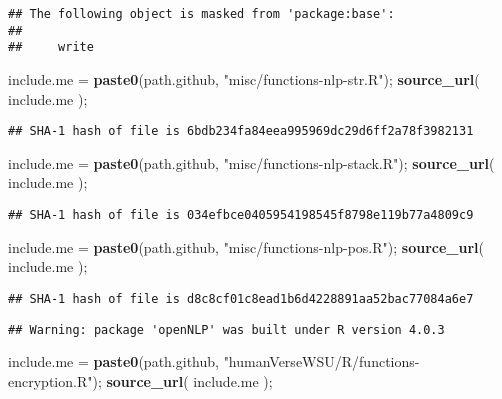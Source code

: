 \documentclass[
]{article}
\newenvironment{Shaded}{\begin{snugshade}}{\end{snugshade}}
\newcommand{\KeywordTok}[1]{\textcolor[rgb]{0.13,0.29,0.53}{\textbf{#1}}}
\newcommand{\NormalTok}[1]{#1}
\newcommand{\StringTok}[1]{\textcolor[rgb]{0.31,0.60,0.02}{#1}}
\begin{document}
\begin{verbatim}
## The following object is masked from 'package:base':
## 
##     write
\end{verbatim}

\begin{Shaded}
\begin{Highlighting}[]
\NormalTok{include.me =}\StringTok{ }\KeywordTok{paste0}\NormalTok{(path.github, }\StringTok{"misc/functions{-}nlp{-}str.R"}\NormalTok{);}
\KeywordTok{source\_url}\NormalTok{( include.me );}
\end{Highlighting}
\end{Shaded}

\begin{verbatim}
## SHA-1 hash of file is 6bdb234fa84eea995969dc29d6ff2a78f3982131
\end{verbatim}

\begin{Shaded}
\begin{Highlighting}[]
\NormalTok{include.me =}\StringTok{ }\KeywordTok{paste0}\NormalTok{(path.github, }\StringTok{"misc/functions{-}nlp{-}stack.R"}\NormalTok{);}
\KeywordTok{source\_url}\NormalTok{( include.me );}
\end{Highlighting}
\end{Shaded}

\begin{verbatim}
## SHA-1 hash of file is 034efbce0405954198545f8798e119b77a4809c9
\end{verbatim}

\begin{Shaded}
\begin{Highlighting}[]
\NormalTok{include.me =}\StringTok{ }\KeywordTok{paste0}\NormalTok{(path.github, }\StringTok{"misc/functions{-}nlp{-}pos.R"}\NormalTok{);}
\KeywordTok{source\_url}\NormalTok{( include.me );}
\end{Highlighting}
\end{Shaded}

\begin{verbatim}
## SHA-1 hash of file is d8c8cf01c8ead1b6d4228891aa52bac77084a6e7
\end{verbatim}

\begin{verbatim}
## Warning: package 'openNLP' was built under R version 4.0.3
\end{verbatim}

\begin{Shaded}
\begin{Highlighting}[]
\NormalTok{include.me =}\StringTok{ }\KeywordTok{paste0}\NormalTok{(path.github, }\StringTok{"humanVerseWSU/R/functions{-}encryption.R"}\NormalTok{);}
\KeywordTok{source\_url}\NormalTok{( include.me );}
\end{Highlighting}
\end{Shaded}
\end{document}
